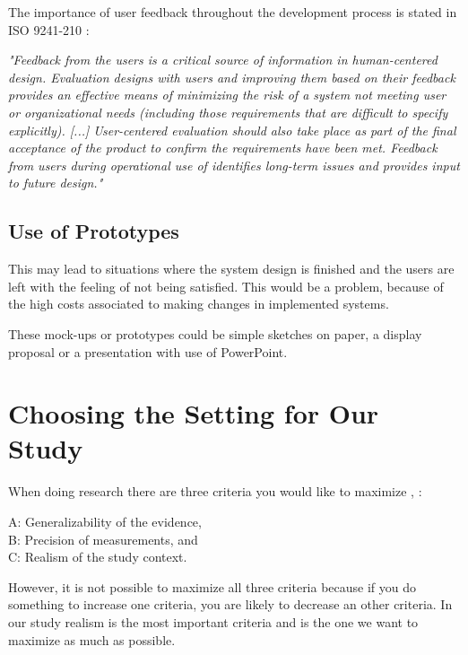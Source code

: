 The importance of user feedback throughout the development process is stated in ISO 9241-210 \cite{dis20109241}:

\emph{"Feedback from the users is a critical source of information in human-centered design. Evaluation designs with users and improving them based on their feedback provides an effective means of minimizing the risk of a system not meeting user or organizational needs (including those requirements that are difficult to specify explicitly).  [...] User-centered evaluation should also take place as part of the final acceptance of the product to confirm the requirements have been met. Feedback from users during operational use of identifies long-term issues and provides input to future design."}

\subsection{Use of Prototypes}
\label{sec:prototypes}

This may lead to situations where the system design is finished and the users are left with the feeling of not being satisfied. This would be a problem, because of the high costs associated to making changes in implemented systems.

These mock-ups or prototypes could be simple sketches on paper, a display proposal or a presentation with use of PowerPoint.

\section{Choosing the Setting for Our Study}
\label{sec:experimental}
When doing research there are three criteria you would like to maximize \cite{McGrath}, \cite{alsos}: 
 
A: Generalizability of the evidence, \\
B: Precision of measurements, and \\
C: Realism of the study context.  

However, it is not possible  to maximize all three criteria because if you do something to increase one criteria, you are likely to decrease an other criteria. In our study realism is the most important criteria and is the one we want to maximize as much as possible.

